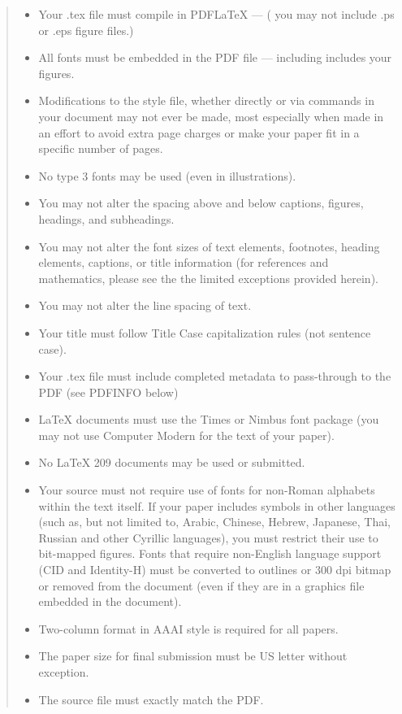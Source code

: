 \documentclass[letterpaper]{article} %
\begin{document}
\begin{quote}
\begin{itemize}
\item Your .tex file must compile in PDF\LaTeX{} --- ( you may not include .ps or .eps figure files.)
\item All fonts must be embedded in the PDF file --- including includes your figures.
\item Modifications to the style file, whether directly or via commands in your document may not ever be made, most especially when made in an effort to avoid extra page charges or make your paper fit in a specific number of pages.
\item No type 3 fonts may be used (even in illustrations).
\item You may not alter the spacing above and below captions, figures, headings, and subheadings.
\item You may not alter the font sizes of text elements, footnotes, heading elements, captions, or title information (for references and mathematics, please see the the limited exceptions provided herein).
\item You may not alter the line spacing of text.
\item Your title must follow Title Case capitalization rules (not sentence case).
\item Your .tex file must include completed metadata to pass-through to the PDF (see PDFINFO below)
\item \LaTeX{} documents must use the Times or Nimbus font package (you may not use Computer Modern for the text of your paper).
\item No \LaTeX{} 209 documents may be used or submitted.
\item Your source must not require use of fonts for non-Roman alphabets within the text itself. If your paper includes symbols in other languages (such as, but not limited to, Arabic, Chinese, Hebrew, Japanese, Thai, Russian and other Cyrillic languages), you must restrict their use to bit-mapped figures. Fonts that require non-English language support (CID and Identity-H) must be converted to outlines or 300 dpi bitmap or removed from the document (even if they are in a graphics file embedded in the document). 
\item Two-column format in AAAI style is required for all papers.
\item The paper size for final submission must be US letter without exception.
\item The source file must exactly match the PDF.

\end{itemize}
\end{quote}
\end{document}
